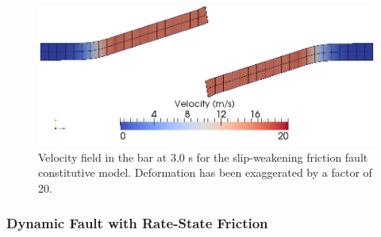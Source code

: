 \noindent \begin{center}
\begin{figure}
\begin{centering}
\includegraphics[scale=0.5]{tutorials/shearwave/figs/quad4slipweakening30}
\par\end{centering}

\caption{Velocity field in the bar at 3.0 s for the slip-weakening friction
fault constitutive model. Deformation has been exaggerated by a factor
of 20.\label{fig:shearwave:quad4:slipweakening}}
\end{figure}

\par\end{center}


\subsubsection{Dynamic Fault with Rate-State Friction}

